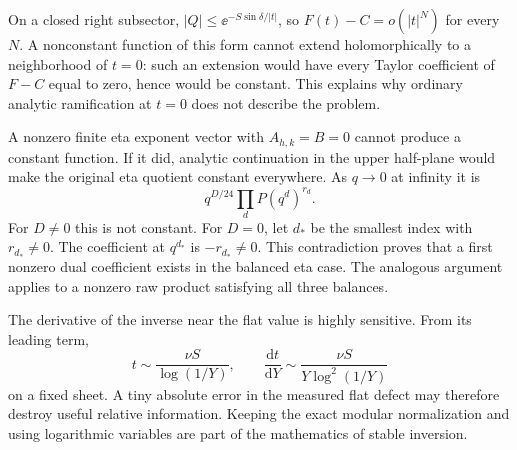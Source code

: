 On a closed right subsector,
\(|Q|\le\ee^{-S\sin\delta/|t|}\), so
\(F(t)-C=o(|t|^N)\) for every \(N\).
A nonconstant function of this form cannot extend
holomorphically to a neighborhood of \(t=0\):
such an extension would have every Taylor coefficient of
\(F-C\) equal to zero, hence would be constant.
This explains why ordinary analytic ramification at \(t=0\)
does not describe the problem.

A nonzero finite eta exponent vector with
\(A_{h,k}=B=0\) cannot produce a constant function.
If it did, analytic continuation in the upper half-plane would
make the original eta quotient constant everywhere.
As \(q\to0\) at infinity it is
\[
 q^{D/24}\prod_dP(q^d)^{r_d}.
\]
For \(D\ne0\) this is not constant.
For \(D=0\), let \(d_*\) be the smallest index with \(r_{d_*}\ne0\).
The coefficient at \(q^{d_*}\) is \(-r_{d_*}\ne0\).
This contradiction proves that a first nonzero dual coefficient
exists in the balanced eta case.
The analogous argument applies to a nonzero raw product satisfying
all three balances.

The derivative of the inverse near the flat value is highly
sensitive.  From its leading term,
\[
 t\sim\frac{\nu S}{\log(1/Y)},\qquad
 \frac{\mathrm dt}{\mathrm dY}
 \sim\frac{\nu S}{Y\log^2(1/Y)}
\]
on a fixed sheet.
A tiny absolute error in the measured flat defect may therefore
destroy useful relative information.  Keeping the exact modular
normalization and using logarithmic variables are part of the
mathematics of stable inversion.

